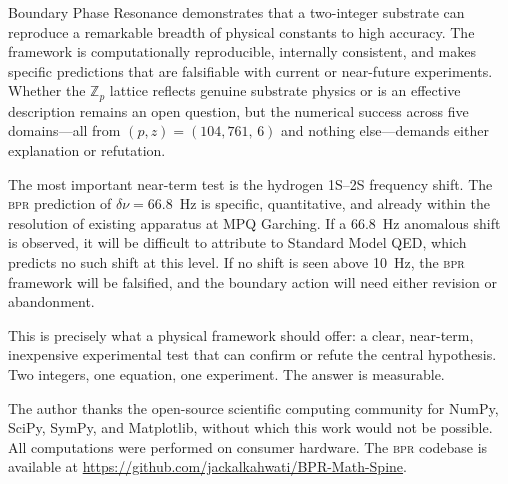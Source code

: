 \documentclass[aps,prd,twocolumn,superscriptaddress,longbibliography,nofootinbib]{revtex4-2}
\newcommand{\Zp}{\mathbb{Z}_p}
\newcommand{\bpr}{\textsc{bpr}}
\begin{document}
Boundary Phase Resonance demonstrates that a two-integer substrate
can reproduce a remarkable breadth of physical constants to high
accuracy.  The framework is computationally reproducible, internally
consistent, and makes specific predictions that are falsifiable with
current or near-future experiments.  Whether the $\Zp$ lattice
reflects genuine substrate physics or is an effective description
remains an open question, but the numerical success across five
domains---all from $(p, z) = (104{,}761,\, 6)$ and nothing
else---demands either explanation or refutation.

The most important near-term test is the hydrogen 1S--2S frequency
shift.  The \bpr{} prediction of $\delta\nu = 66.8$~Hz is specific,
quantitative, and already within the resolution of existing
apparatus at MPQ Garching.  If a 66.8~Hz anomalous shift is
observed, it will be difficult to attribute to Standard Model QED,
which predicts no such shift at this level.  If no shift is seen
above 10~Hz, the \bpr{} framework will be falsified, and the
boundary action will need either revision or abandonment.

This is precisely what a physical framework should offer: a clear,
near-term, inexpensive experimental test that can confirm or refute
the central hypothesis.  Two integers, one equation, one
experiment.  The answer is measurable.


\begin{acknowledgments}
The author thanks the open-source scientific computing community
for NumPy, SciPy, SymPy, and Matplotlib, without which this work
would not be possible.  All computations were performed on consumer
hardware.  The \bpr{} codebase is available at
\url{https://github.com/jackalkahwati/BPR-Math-Spine}.
\end{acknowledgments}
\end{document}
